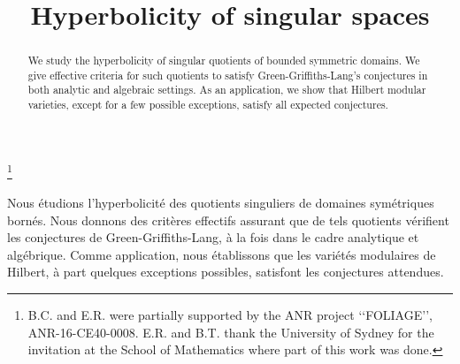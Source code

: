 \documentclass[JEP,XML,SOM,Unicode]{cedram}
\theoremstyle{plain}
\theoremstyle{definition}
\numberwithin{equation}{theorem}
\begin{document}
\frontmatter
\title{Hyperbolicity of singular spaces}

\author[\initial{B.} \lastname{Cadorel}]{ }
\address{Institut de Mathématiques de Toulouse (IMT), Université Paul Sabatier\\
118 route de Narbonne, F-31062 Toulouse Cedex 9, France}

\author[\initial{E.} \lastname{Rousseau}]{ }
\address{Institut Universitaire de France
\& Université d'Aix Marseille, CNRS, Centrale Marseille, I2M\\
39, rue Frédéric Joliot-Curie, 13453 Marseille Cedex 13, France }

\author[\initial{B.} \lastname{Taji}]{ }
\address{University of Notre Dame, Department of Mathematics\\
278 Hurley, Notre Dame, IN 46556, USA}

\thanks{B.C. and E.R. were partially supported by the ANR project \lq\lq FOLIAGE\rq\rq{}, ANR-16-CE40-0008. E.R. and B.T. thank the University of Sydney for the invitation at the School of Mathematics where part of this work was done.}



\begin{abstract}
We study the hyperbolicity of singular quotients of bounded symmetric domains. We give effective criteria for such quotients to satisfy Green-Griffiths-Lang's conjectures in both analytic and algebraic settings. As an application, we show that Hilbert modular varieties, except for a few possible exceptions, satisfy all expected conjectures.
\end{abstract}



\begin{altabstract}
Nous étudions l’hyperbolicité des quotients singuliers de domaines symétriques bornés. Nous donnons des critères effectifs assurant que de tels quotients vérifient les conjectures de Green-Griffiths-Lang, à la fois dans le cadre analytique et algébrique. Comme application, nous établissons que les variétés modulaires de Hilbert, à part quelques exceptions possibles, satisfont les conjectures attendues.
\end{altabstract}
\end{document}
